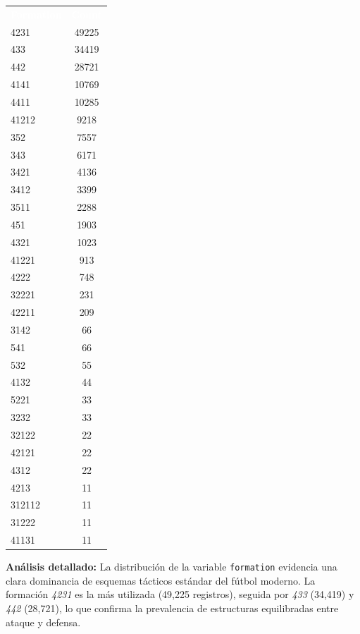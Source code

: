 \documentclass[12pt,a4paper]{article}
\newcommand{\thead}[1]{%
  \cellcolor{tableheader}\textcolor{white}{\textbf{#1}}%
}
\begin{document}
\begin{center}
\small
\begin{tabular}{lc}
\rowcolor{tableheader}
\thead{Formation} & \thead{Count} \\
\rowcolor{tablealt} 4231 & 49225 \\
\rowcolor{tablerow} 433 & 34419 \\
\rowcolor{tablealt} 442 & 28721 \\
\rowcolor{tablerow} 4141 & 10769 \\
\rowcolor{tablealt} 4411 & 10285 \\
\rowcolor{tablerow} 41212 & 9218 \\
\rowcolor{tablealt} 352 & 7557 \\
\rowcolor{tablerow} 343 & 6171 \\
\rowcolor{tablealt} 3421 & 4136 \\
\rowcolor{tablerow} 3412 & 3399 \\
\rowcolor{tablealt} 3511 & 2288 \\
\rowcolor{tablerow} 451 & 1903 \\
\rowcolor{tablealt} 4321 & 1023 \\
\rowcolor{tablerow} 41221 & 913 \\
\rowcolor{tablealt} 4222 & 748 \\
\rowcolor{tablerow} 32221 & 231 \\
\rowcolor{tablealt} 42211 & 209 \\
\rowcolor{tablerow} 3142 & 66 \\
\rowcolor{tablealt} 541 & 66 \\
\rowcolor{tablerow} 532 & 55 \\
\rowcolor{tablealt} 4132 & 44 \\
\rowcolor{tablerow} 5221 & 33 \\
\rowcolor{tablealt} 3232 & 33 \\
\rowcolor{tablerow} 32122 & 22 \\
\rowcolor{tablealt} 42121 & 22 \\
\rowcolor{tablerow} 4312 & 22 \\
\rowcolor{tablealt} 4213 & 11 \\
\rowcolor{tablerow} 312112 & 11 \\
\rowcolor{tablealt} 31222 & 11 \\
\rowcolor{tablerow} 41131 & 11 \\
\end{tabular}
\end{center}

\textbf{Análisis detallado:}
La distribución de la variable \texttt{formation} evidencia una clara dominancia de esquemas tácticos estándar del fútbol moderno. La formación \textit{4231} es la más utilizada (49,225 registros), seguida por \textit{433} (34,419) y \textit{442} (28,721), lo que confirma la prevalencia de estructuras equilibradas entre ataque y defensa.
\end{document}
